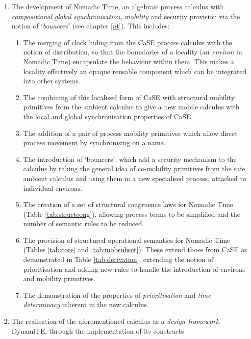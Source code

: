\begin{enumerate}
\item The development of Nomadic Time, an algebraic process calculus
  with \emph{compositional global synchronisation}, \emph{mobility}
  and security provision via the notion of `\emph{bouncers}'
  (see chapter \ref{nt}).  This includes:
\begin{enumerate}[\bfseries {C1.}1]
\item The merging of clock hiding from the CaSE process calculus
  \cite{CaSE} with the notion of distribution, so that the boundaries
  of a locality (an \emph{environ} in Nomadic Time) encapsulate the
  behaviour within them.  This makes a locality effectively an opaque
  reusable component which can be integrated into other systems.
\item The combining of this localised form of CaSE with structural
  mobility primitives from the ambient calculus \cite{amb} to give a
  new mobile calculus with the local and global synchronisation
  properties of CaSE.
\item The addition of a pair of process mobility primitives which
  allow direct process movement by synchronising on a name.
\item The introduction of `bouncers', which add a security mechanism
  to the calculus by taking the general idea of co-mobility primitives
  from the safe ambient calculus \cite{sangiorgi:mobsafeambients} and
  using them in a new specialised process, attached to individual
  environs.
\item The creation of a set of structural congruence laws for Nomadic
  Time (Table \ref{tab:structcong}), allowing process terms to be
  simplified and the number of semantic rules to be reduced.
\item The provision of structured operational semantics for Nomadic
  Time (Tables \ref{tab:core} and \ref{tab:mobsubset}).  These extend
  those from CaSE as demonstrated in Table \ref{tab:derivation},
  extending the notion of prioritisation and adding new rules to handle
  the introduction of environs and mobility primitives.
\item The demonstration of the properties of \emph{prioritisation} and
  \emph{time determinacy} inherent in the new calculus.
\end{enumerate}
\item The realisation of the aforementioned calculus as a \emph{design
  framework}, DynamiTE, through the implementation of its constructs

\end{enumerate}
